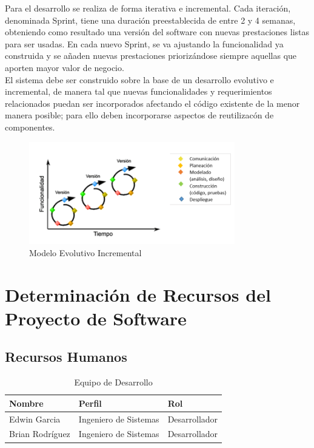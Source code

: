 Para el desarrollo se realiza de forma iterativa e incremental. Cada iteraci\'on, denominada Sprint, tiene una duraci\'on preestablecida de entre 2 y 4 semanas, obteniendo como resultado una versi\'on del software con nuevas prestaciones listas para ser usadas. En cada nuevo Sprint, se va ajustando la funcionalidad ya construida y se añaden nuevas prestaciones prioriz\'andose siempre aquellas que aporten mayor valor de negocio.\\

El sistema debe ser construido sobre la base de un desarrollo evolutivo e incremental, de manera tal que nuevas funcionalidades y requerimientos relacionados puedan ser incorporados afectando el c\'odigo existente de la menor manera posible; para ello deben incorporarse aspectos de reutilizac\'on de componentes.

\begin{center}
\begin{figure}[htb]
\centering
\includegraphics[width = 0.8\textwidth]{./capitulo4/img/modIncremental.png}
\caption{Modelo Evolutivo Incremental}
\end{figure}
\end{center}
\newpage

\section{Determinaci\'on de Recursos del Proyecto de Software}
\subsection{Recursos Humanos}
\begin{table}[h!]
	\begin{center}
		\begin{tabular}{|p{5cm} |p{5cm}|p{4cm}|} 
			\hline \textbf{Nombre} & \textbf{Perfil} & \textbf{Rol} \\
			\hline Edwin Garcia & Ingeniero de Sistemas & Desarrollador \\ 
			\hline Brian Rodr\'iguez & Ingeniero de Sistemas & Desarrollador \\
			\hline
		\end{tabular}
		\caption{Equipo de Desarrollo}
		\label{teamDevelop}
	\end{center}
\end{table}
